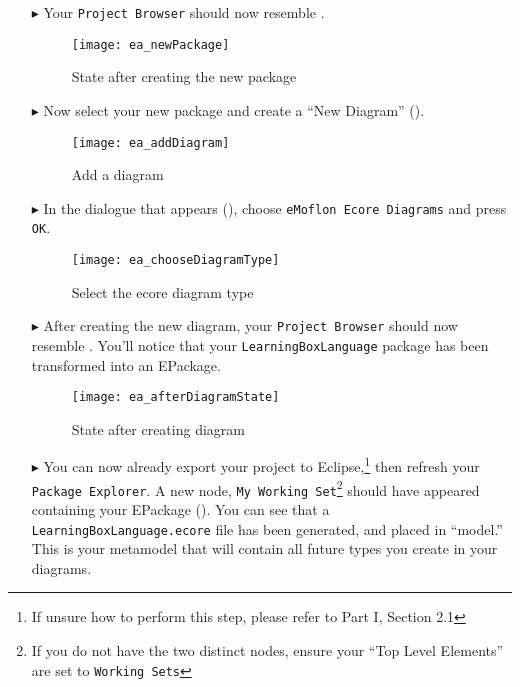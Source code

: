 \begin{itemize}
\vspace{0.5cm}

\item[$\blacktriangleright$] Your \texttt{Project Browser} should now resemble .

\vspace{0.5cm}

\begin{figure}[htbp]
	\centering
  \texttt{[image: ea\_newPackage]}
	\caption{State after creating the new package}
	\label{ea:newPackageComplete}
\end{figure}
\FloatBarrier

\vspace{0.5cm}

\item[$\blacktriangleright$] Now select your new package and create a ``New Diagram'' ().

\vspace{0.5cm}

\begin{figure}[htbp]
	\centering
  \texttt{[image: ea\_addDiagram]}
	\caption{Add a diagram}
	\label{ea:newDiagram}
\end{figure}
\FloatBarrier

\clearpage

\item[$\blacktriangleright$] In the dialogue that appears (), choose \texttt{eMoflon Ecore Diagrams} and press \texttt{OK}. 

\begin{figure}[htbp]
	\centering
  \texttt{[image: ea\_chooseDiagramType]}
	\caption{Select the ecore diagram type}
	\label{ea:diagramType}
\end{figure}
\FloatBarrier

 
\item[$\blacktriangleright$] After creating the new diagram, your  \texttt{Project Browser} should now resemble . You'll notice
that your \texttt{LearningBoxLanguage} package has been transformed into an EPackage.

\begin{figure}[htbp]
	\centering
  \texttt{[image: ea\_afterDiagramState]}
	\caption{State after creating diagram}
	\label{ea:diagramComplete}
\end{figure}
\FloatBarrier

\item[$\blacktriangleright$] You can now already export your project to Eclipse,\footnote{If unsure how to perform this step, please refer to Part I, Section
2.1} then refresh your \texttt{Package Explorer}. A new node, \texttt{My Working Set}\footnote{If you do not have the two distinct nodes, ensure your ``Top
Level Elements'' are set to \texttt{Working Sets}} should have appeared containing your EPackage (). You can see that a
\texttt{LearningBoxLanguage.ecore} file has been generated, and placed in ``model.'' This is your metamodel that will contain all future types you create in
your diagrams.


\end{itemize}
